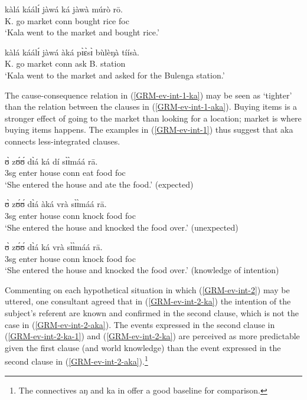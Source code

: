 \ea\label{GRM-ev-int-1} 

\ea\label{GRM-ev-int-1-ka} 
\gll kàlá káálɪ́ jàwá ká jàwà múrò rō.\\
K. go market {\sc conn} bought rice {\sc foc}\\
\glt  `Kala went to the market and bought rice.'

\ex\label{GRM-ev-int-1-aka} 
\gll  kàlá káálɪ́ jàwá àká pɪ̀ɛ̀sɪ̀ bùlèŋà tíísà.\\
K. go market {\sc conn} ask B. station\\
\glt  `Kala went to the market and asked for the Bulenga station.' 

\z 
 \z


The cause-consequence relation in (\ref{GRM-ev-int-1-ka}) may be seen as `tighter' than the relation between the clauses in (\ref{GRM-ev-int-1-aka}). Buying items is a stronger effect of going to the market than looking for a location; market is where buying items happens. The examples in (\ref{GRM-ev-int-1}) thus suggest that {\sls aka} connects less-integrated clauses. 
 
\ea\label{GRM-ev-int-2} 
 
\ea\label{GRM-ev-int-2-ka-1} 
\gll ʊ̀ zʊ́ʊ́ dɪ̀á ká dí sɪ̀ɪ̀máá rā.\\
 {\sc 3sg} enter house {\sc conn} eat food  {\sc foc}\\
\glt `She entered the house and ate the food.' (expected)

\ex\label{GRM-ev-int-2-aka} 
\gll  ʊ̀ zʊ́ʊ́ dɪ̀á àká vrà sɪ̀ɪ̀máá rā.\\
{\sc 3sg} enter house {\sc conn} knock food  {\sc foc}\\
\glt `She entered the house and knocked the food over.' (unexpected)

\ex\label{GRM-ev-int-2-ka} 
\gll ʊ̀ zʊ́ʊ́ dɪ̀á ká vrà sɪ̀ɪ̀máá rā.\\
{\sc 3sg} enter house {\sc conn} knock food  {\sc foc}\\
\glt `She entered the house and knocked the food over.' (knowledge of intention)

\z 
 \z

Commenting on each hypothetical situation in which (\ref{GRM-ev-int-2}) may be 
uttered, one consultant agreed 
that in (\ref{GRM-ev-int-2-ka}) the intention of the subject's referent are 
known and confirmed in the second clause, which is not the case in   
(\ref{GRM-ev-int-2-aka}). The  events expressed in the second clause in  
(\ref{GRM-ev-int-2-ka-1}) and  (\ref{GRM-ev-int-2-ka}) are perceived as more 
predictable given the first clause (and world knowledge) than the event 
expressed in the second clause  in (\ref{GRM-ev-int-2-aka}).\footnote{The 
connectives {\sls aŋ}  and {\sls ka} in  \citep{mcgi99} offer a good 
baseline for comparison.}  




